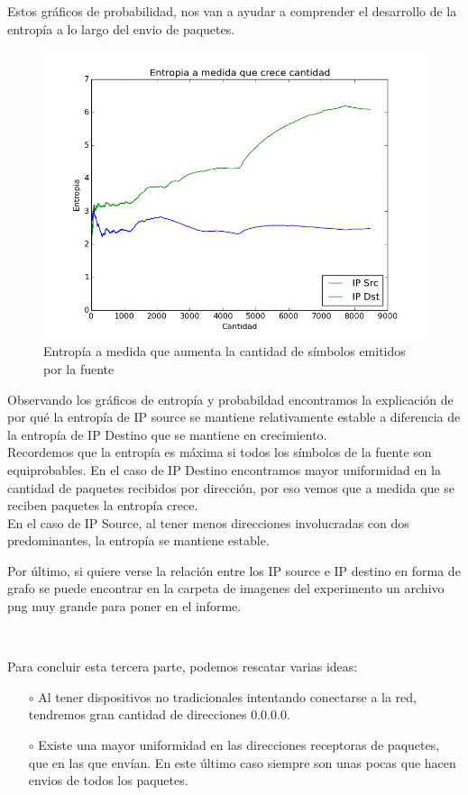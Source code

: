 Estos gr\'aficos de probabilidad, nos van a ayudar a comprender el desarrollo de la
entrop\'ia a lo largo del envio de paquetes.


\begin{figure}[h!]
\centering
\includegraphics[width=0.7\linewidth]{imagenes/exp3/EntropiaIp}
\caption{Entrop\'ia a medida que aumenta la cantidad de s\'imbolos emitidos por la fuente}
\label{exp3grafico4}
\end{figure}

Observando los gr\'aficos de entrop\'ia y probabildad encontramos la explicaci\'on de
por qu\'e la entrop\'ia de IP source se mantiene relativamente estable a diferencia
de la entrop\'ia de IP Destino que se mantiene en crecimiento. \\

Recordemos que la entrop\'ia es m\'axima si todos los s\'imbolos de la fuente son equiprobables.
En el caso de IP Destino encontramos mayor uniformidad en la cantidad de paquetes
recibidos por direcci\'on, por eso vemos que a medida que se reciben paquetes la entrop\'ia
crece. \\

En el caso de IP Source, al tener menos direcciones involucradas con dos predominantes,
la entrop\'ia se mantiene estable.

Por \'ultimo, si quiere verse la relación entre los IP source e IP destino en
forma de grafo se puede encontrar en la carpeta de imagenes del experimento un archivo png
muy grande para poner en el informe.

\

Para concluir esta tercera parte, podemos rescatar varias ideas:

\begin{itemize}
\item[$\circ$] Al tener dispositivos no tradicionales intentando conectarse a la red,
tendremos gran cantidad de direcciones 0.0.0.0.
\item[$\circ$] Existe una mayor uniformidad en las direcciones receptoras de paquetes, que en las que envían.
En este último caso siempre son unas pocas que hacen envios de todos los paquetes.
\end{itemize}
